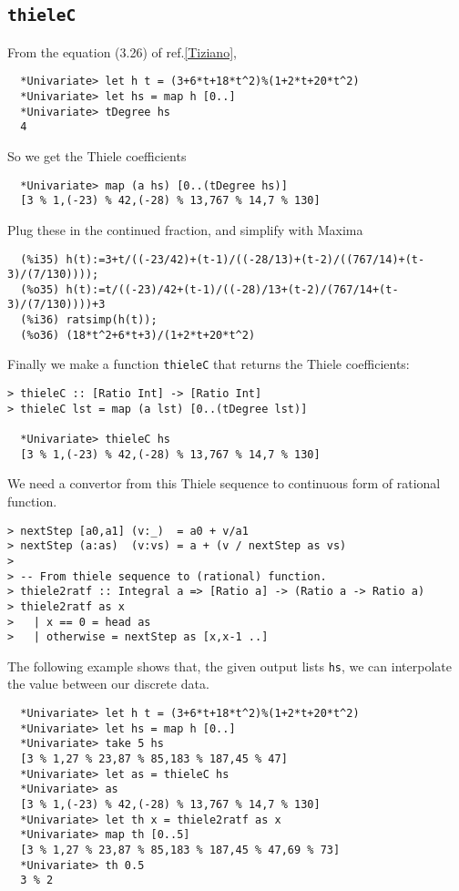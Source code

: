 \documentclass[11pt]{book}
\begin{document}
\subsection{\texttt{thieleC}}
From the equation (3.26) of ref.\ref{Tiziano},
\begin{verbatim}
  *Univariate> let h t = (3+6*t+18*t^2)%(1+2*t+20*t^2)
  *Univariate> let hs = map h [0..]
  *Univariate> tDegree hs
  4
\end{verbatim}
So we get the Thiele coefficients
\begin{verbatim}  
  *Univariate> map (a hs) [0..(tDegree hs)]
  [3 % 1,(-23) % 42,(-28) % 13,767 % 14,7 % 130]
\end{verbatim}
Plug these in the continued fraction, and simplify with Maxima
\begin{verbatim}
  (%i35) h(t):=3+t/((-23/42)+(t-1)/((-28/13)+(t-2)/((767/14)+(t-3)/(7/130))));
  (%o35) h(t):=t/((-23)/42+(t-1)/((-28)/13+(t-2)/(767/14+(t-3)/(7/130))))+3
  (%i36) ratsimp(h(t));
  (%o36) (18*t^2+6*t+3)/(1+2*t+20*t^2)
\end{verbatim}

Finally we make a function \verb+thieleC+ that returns the Thiele coefficients:
\begin{verbatim}
> thieleC :: [Ratio Int] -> [Ratio Int]
> thieleC lst = map (a lst) [0..(tDegree lst)]

  *Univariate> thieleC hs
  [3 % 1,(-23) % 42,(-28) % 13,767 % 14,7 % 130]
\end{verbatim}

We need a convertor from this Thiele sequence to continuous form of rational function.
\begin{verbatim}
> nextStep [a0,a1] (v:_)  = a0 + v/a1
> nextStep (a:as)  (v:vs) = a + (v / nextStep as vs)
>
> -- From thiele sequence to (rational) function.
> thiele2ratf :: Integral a => [Ratio a] -> (Ratio a -> Ratio a)
> thiele2ratf as x
>   | x == 0 = head as
>   | otherwise = nextStep as [x,x-1 ..]
\end{verbatim}
The following example shows that, the given output lists \verb+hs+, we can interpolate the value between our discrete data.
\begin{verbatim}
  *Univariate> let h t = (3+6*t+18*t^2)%(1+2*t+20*t^2)
  *Univariate> let hs = map h [0..]
  *Univariate> take 5 hs
  [3 % 1,27 % 23,87 % 85,183 % 187,45 % 47]
  *Univariate> let as = thieleC hs
  *Univariate> as
  [3 % 1,(-23) % 42,(-28) % 13,767 % 14,7 % 130]
  *Univariate> let th x = thiele2ratf as x
  *Univariate> map th [0..5]
  [3 % 1,27 % 23,87 % 85,183 % 187,45 % 47,69 % 73]
  *Univariate> th 0.5
  3 % 2
\end{verbatim}
\end{document}
